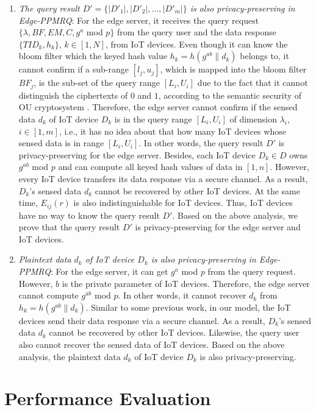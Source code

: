 \documentclass[IEEE JOURNAL OF BIOMEDICAL AND HEALTH INFORMATICS]{IEEEtran}
\begin{document}
\begin{enumerate}
	\item \emph{The query result $D'=\{|D'_1|, |D'_2|, ... , |D'_m|\}$ is also privacy-preserving in Edge-PPMRQ}:
	For the edge server, it receives the query request $\{\lambda, BF, EM, C, g^a$ mod $p\}$ from the query user and the data response $\{TID_k, h_k\}$, $k \in [1, N]$, from IoT devices. Even though it can know the bloom filter which the keyed hash value $h_k=h(g^{ab} \| d_k)$ belongs to, 
	it cannot confirm if a sub-range $[l_j, u_j]$, which is mapped into the bloom filter $BF_j$, is the sub-set of the query range $[L_i, U_i]$ due to the fact that it cannot distinguish the ciphertexts of $0$ and $1$, according to the semantic security of OU cryptosystem \cite{ou1998}.
    Therefore, the edge server cannot confirm if the sensed data $d_k$ of IoT device $D_k$ is in the query range $[L_i, U_i]$ of dimension $\lambda_i$, $i\in [1, m]$, i.e., it has no idea about that how many IoT devices whose sensed data is in range $[L_i, U_i]$. In other words, the query result $D'$ is privacy-preserving for the edge server. Besides, each IoT device $D_k \in D$ owns $g^{ab}$ mod $p$ and can compute all keyed hash values of data in $[1, n]$. However, every IoT device transfers its data response via a secure channel. As a result, $D_k$'s sensed data $d_k$ cannot be recovered by other IoT devices. At the same time, $E_{ij}(r)$ is also indistinguishable for IoT devices. Thus, IoT devices have no way to know the query result $D'$. Based on the above analysis, we prove that the query result $D'$ is privacy-preserving for the edge server and IoT devices.
	
	\item \emph{Plaintext data $d_k$ of IoT device $D_k$ is also privacy-preserving in Edge-PPMRQ}:
	For the edge server, it can get $g^a$ mod $p$ from the query request. However, $b$ is the private parameter of IoT devices. Therefore, the edge server cannot compute $g^{ab}$ mod $p$. In other words, it cannot recover $d_k$ from $h_k=h(g^{ab}\| d_k)$. Similar to some previous work, in our model, the IoT devices send their data response via a secure channel. As a result, $D_k$'s sensed data $d_k$ cannot be recovered by other IoT devices. Likewise, the query user also cannot recover the sensed data of IoT devices. Based on the above analysis, the plaintext data $d_k$ of IoT device $D_k$ is also privacy-preserving.
\end{enumerate}


\section{Performance Evaluation}
\end{document}
